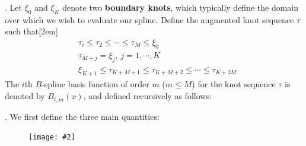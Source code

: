 \documentclass[12pt]{article}
\newcommand\myfig[2][0.3\textwidth]{\begin{figure}[h!]\centering\texttt{[image: \#2]}\end{figure}}
\newcommand{\myspace}{\vspace{2\bigskipamount}}
\newcommand\p{\Needspace{10\baselineskip} \noindent}
\begin{document}
\myspace
\p {}. Let $\xi_0$ and $\xi_K$ denote two \textbf{boundary knots}, which typically define the domain over which we wish to evaluate our spline. Define the augmented knot sequence $\tau$ such that[2em]
\begin{align}
	&\tau_i \le \tau_2 \le \cdots \le \tau_M \le \xi_0 \\
	&\tau_{M + j} = \xi_j, ~ j = 1, \cdots, K \\
	&\xi_{K + 1} \le \tau_{K + M + 1} \le \tau_{K + M + 2} \le \cdots \le \tau_{K + 2M}
\end{align}
The $i$th $B$-spline basis function of order $m$ ($m \le M$) for the knot sequence $\tau$ is denoted by $B_{i,m}(x)$, and defined recursively as follows:




\p {}. We first define the three main quantities:

\myfig[0.5\textwidth]{figs/BiasVarianceComplexity.png}
\end{document}
